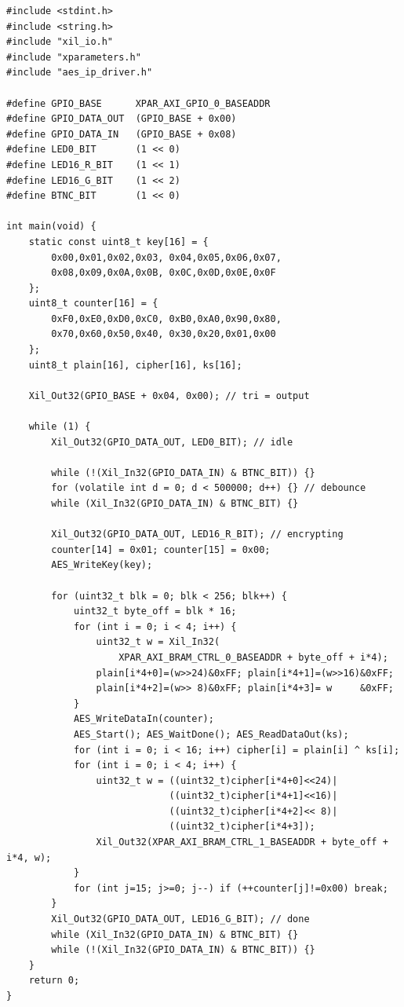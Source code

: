 \documentclass[12pt,a4paper]{article}
\begin{document}
\begin{lstlisting}[style=cstyle, caption={main.c -- AES-128 CTR Image Encryption Firmware (JTAG-Only)}]
#include <stdint.h>
#include <string.h>
#include "xil_io.h"
#include "xparameters.h"
#include "aes_ip_driver.h"

#define GPIO_BASE      XPAR_AXI_GPIO_0_BASEADDR
#define GPIO_DATA_OUT  (GPIO_BASE + 0x00)
#define GPIO_DATA_IN   (GPIO_BASE + 0x08)
#define LED0_BIT       (1 << 0)
#define LED16_R_BIT    (1 << 1)
#define LED16_G_BIT    (1 << 2)
#define BTNC_BIT       (1 << 0)

int main(void) {
    static const uint8_t key[16] = {
        0x00,0x01,0x02,0x03, 0x04,0x05,0x06,0x07,
        0x08,0x09,0x0A,0x0B, 0x0C,0x0D,0x0E,0x0F
    };
    uint8_t counter[16] = {
        0xF0,0xE0,0xD0,0xC0, 0xB0,0xA0,0x90,0x80,
        0x70,0x60,0x50,0x40, 0x30,0x20,0x01,0x00
    };
    uint8_t plain[16], cipher[16], ks[16];

    Xil_Out32(GPIO_BASE + 0x04, 0x00); // tri = output

    while (1) {
        Xil_Out32(GPIO_DATA_OUT, LED0_BIT); // idle

        while (!(Xil_In32(GPIO_DATA_IN) & BTNC_BIT)) {}
        for (volatile int d = 0; d < 500000; d++) {} // debounce
        while (Xil_In32(GPIO_DATA_IN) & BTNC_BIT) {}

        Xil_Out32(GPIO_DATA_OUT, LED16_R_BIT); // encrypting
        counter[14] = 0x01; counter[15] = 0x00;
        AES_WriteKey(key);

        for (uint32_t blk = 0; blk < 256; blk++) {
            uint32_t byte_off = blk * 16;
            for (int i = 0; i < 4; i++) {
                uint32_t w = Xil_In32(
                    XPAR_AXI_BRAM_CTRL_0_BASEADDR + byte_off + i*4);
                plain[i*4+0]=(w>>24)&0xFF; plain[i*4+1]=(w>>16)&0xFF;
                plain[i*4+2]=(w>> 8)&0xFF; plain[i*4+3]= w     &0xFF;
            }
            AES_WriteDataIn(counter);
            AES_Start(); AES_WaitDone(); AES_ReadDataOut(ks);
            for (int i = 0; i < 16; i++) cipher[i] = plain[i] ^ ks[i];
            for (int i = 0; i < 4; i++) {
                uint32_t w = ((uint32_t)cipher[i*4+0]<<24)|
                             ((uint32_t)cipher[i*4+1]<<16)|
                             ((uint32_t)cipher[i*4+2]<< 8)|
                             ((uint32_t)cipher[i*4+3]);
                Xil_Out32(XPAR_AXI_BRAM_CTRL_1_BASEADDR + byte_off + i*4, w);
            }
            for (int j=15; j>=0; j--) if (++counter[j]!=0x00) break;
        }
        Xil_Out32(GPIO_DATA_OUT, LED16_G_BIT); // done
        while (Xil_In32(GPIO_DATA_IN) & BTNC_BIT) {}
        while (!(Xil_In32(GPIO_DATA_IN) & BTNC_BIT)) {}
    }
    return 0;
}
\end{lstlisting}
\end{document}
